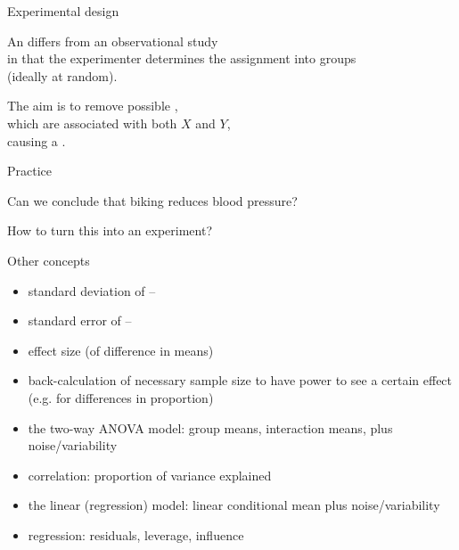 \begin{frame}{Experimental design}

    An  differs from an \alert{observational study} \\
    in that the experimenter determines the assignment into groups\\
    (ideally at random).

    \vspace{2em}

    The aim is to remove possible ,\\
    which are associated with both $X$ and $Y$, \\
    causing a .

    \vspace{2em}

\end{frame}

\begin{frame}{Practice}

    \vfill

    Can we conclude that biking reduces blood pressure?
    \vfill

    How to turn this into an experiment?
    \vfill

\end{frame}

\begin{frame}{Other concepts}
  
  \begin{itemize}
    \item standard deviation of --
    \item standard error of --
    \item effect size (of difference in means)
    \item back-calculation of necessary sample size to have power to see a certain effect (e.g. for differences in proportion)
    \item the two-way ANOVA model: group means, interaction means, plus noise/variability
    \item correlation: proportion of variance explained
    \item the linear (regression) model: linear conditional mean plus noise/variability
    \item regression: residuals, leverage, influence
  \end{itemize}


\end{frame}




